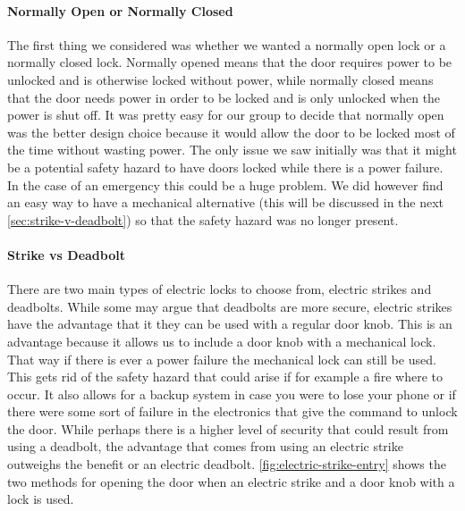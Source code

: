 \paragraph{Normally Open or Normally Closed}
The first thing we considered was whether we wanted a normally open lock or a
normally closed lock. Normally opened means that the door requires power to be
unlocked and is otherwise locked without power, while normally closed means
that the door needs power in order to be locked and is only unlocked when the
power is shut off. It was pretty easy for our group to decide that normally
open was the better design choice because it would allow the door to be locked
most of the time without wasting power. The only issue we saw initially was
that it might be a potential safety hazard to have doors locked while there is
a power failure. In the case of an emergency this could be a huge problem. We
did however find an easy way to have a mechanical alternative (this will be
discussed in the next \autoref{sec:strike-v-deadbolt}) so that the safety hazard was
no longer present.

\paragraph{Strike vs Deadbolt}
\label{sec:strike-v-deadbolt}
There are two main types of electric locks to choose from, electric strikes and
deadbolts. While some may argue that deadbolts are more secure, electric
strikes have the advantage that it they can be used with a regular door knob.
This is an advantage because it allows us to include a door knob with a
mechanical lock. That way if there is ever a power failure the mechanical lock
can still be used. This gets rid of the safety hazard that could arise if for
example a fire where to occur. It also allows for a backup system in case you
were to lose your phone or if there were some sort of failure in the
electronics that give the command to unlock the door. While perhaps there is a
higher level of security that could result from using a deadbolt, the advantage
that comes from using an electric strike outweighs the benefit or an electric
deadbolt. \autoref{fig:electric-strike-entry} shows the two methods for opening the door when
an electric strike and a door knob with a lock is used.


